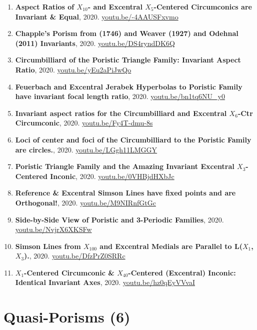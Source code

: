 \documentclass[12pt]{article}
\begin{document}
\begin{enumerate}[resume]
\item \textbf{Aspect Ratios of $X_{10}$- and Excentral $X_{5}$-Centered Circumconics are Invariant \& Equal}, 2020. \href{https://youtu.be/-4AAUSFxvmo}{\url{youtu.be/-4AAUSFxvmo}}
\item \textbf{Chapple's Porism from (1746) and Weaver (1927) and Odehnal (2011) Invariants}, 2020. \href{https://youtu.be/DS4ryndDK6Q}{\url{youtu.be/DS4ryndDK6Q}}
\item \textbf{Circumbilliard of the Poristic Triangle Family: Invariant Aspect Ratio}, 2020. \href{https://youtu.be/yEu2aPiJwQo}{\url{youtu.be/yEu2aPiJwQo}}
\item \textbf{Feuerbach and Excentral Jerabek Hyperbolas to Poristic Family have invariant focal length ratio}, 2020. \href{https://youtu.be/bn1tq6NU_y0}{\url{youtu.be/bn1tq6NU\_y0}}
\item \textbf{Invariant aspect ratios for the Circumbilliard and Excentral $X_{6}$-Ctr Circumconic}, 2020. \href{https://youtu.be/Fy4T-dmu-8s}{\url{youtu.be/Fy4T-dmu-8s}}
\item \textbf{Loci of center and foci of the Circumbilliard to the Poristic Family are circles.}, 2020. \href{https://youtu.be/LGgh11LMGGY}{\url{youtu.be/LGgh11LMGGY}}
\item \textbf{Poristic Triangle Family and the Amazing Invariant Excentral $X_{3}$-Centered Inconic}, 2020. \href{https://youtu.be/0VHBjdHXbJc}{\url{youtu.be/0VHBjdHXbJc}}
\item \textbf{Reference \& Excentral Simson Lines have fixed points and are Orthogonal!}, 2020. \href{https://youtu.be/M9NIRnfGtGc}{\url{youtu.be/M9NIRnfGtGc}}
\item \textbf{Side-by-Side View of Poristic and 3-Periodic Families}, 2020. \href{https://youtu.be/NvjrX6XKSFw}{\url{youtu.be/NvjrX6XKSFw}}
\item \textbf{Simson Lines from $X_{100}$ and Excentral Medials are Parallel to L($X_{1}$, $X_{3}$).}, 2020. \href{https://youtu.be/DfzPrZ0SRRc}{\url{youtu.be/DfzPrZ0SRRc}}
\item \textbf{$X_{1}$-Centered Circumconic \& $X_{40}$-Centered (Excentral) Inconic: Identical Invariant Axes}, 2020. \href{https://youtu.be/hz0qEyVVvaI}{\url{youtu.be/hz0qEyVVvaI}}
\end{enumerate}

\section{Quasi-Porisms (6)}
\end{document}
